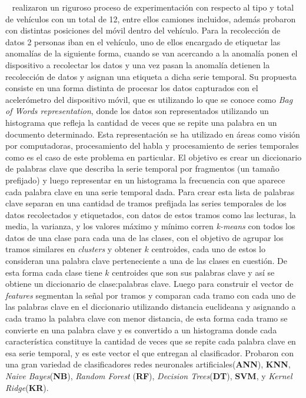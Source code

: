 		~ realizaron un riguroso proceso de experimentación con respecto al tipo y total de vehículos con
		un total de 12, entre ellos camiones incluidos, además probaron con distintas posiciones del móvil dentro del vehículo. Para la recolección de datos 2
		personas iban en el vehículo, uno de ellos encargado de etiquetar las anomalías de la siguiente forma, cuando se van acercando a la anomalía ponen el
		dispositivo a recolectar los datos y una vez pasan la anomalía detienen la recolección de datos y asignan una etiqueta a dicha serie temporal. Su
		propuesta consiste en una forma distinta de procesar los datos capturados con el acelerómetro del dispositivo móvil, que es utilizando lo que se conoce
		como \emph{Bag of Words representation}, donde los datos son representados utilizando un histograma que refleja la cantidad de veces que se repite una
		palabra en un documento determinado. Esta representación se ha utilizado en áreas como visión por computadoras, procesamiento del habla y procesamiento
		de series temporales como es el caso de este problema en particular. El objetivo es crear un diccionario de palabras clave que describa la serie temporal
		por fragmentos (un tamaño prefijado) y luego representar en un histograma la frecuencia con que aparece cada palabra clave en una serie temporal dada.
		Para crear esta lista de palabras clave separan en una cantidad de tramos prefijada las series temporales de los datos recolectados y etiquetados, con
		datos de estos tramos como las lecturas, la media, la varianza, y los valores máximo y mínimo corren \emph{k-means} con todos los datos de una clase para
		cada una de las clases, con el objetivo de agrupar los tramos similares en \emph{clusters} y obtener $k$ centroides, cada uno de estos lo consideran una
		palabra clave perteneciente a una de las clases en cuestión. De esta forma cada clase tiene $k$ centroides que son sus palabras clave y así se obtiene 
		un diccionario de clase:palabras clave. Luego para construir el vector de \emph{features} segmentan la señal por tramos y comparan cada tramo con cada
		uno de las palabras clave en el diccionario utilizando distancia euclideana y asignando a cada tramo la palabra clave con menor distancia, de esta forma
		cada tramo se convierte en una palabra clave y es convertido a un histograma donde cada característica constituye la cantidad de veces que se repite cada
		palabra clave en esa serie temporal, y es este vector el que entregan al clasificador. Probaron con una gran variedad de clasificadores redes neuronales
		artificiales(\textbf{ANN}), \textbf{KNN}, \emph{Naive Bayes}(\textbf{NB}), \emph{Random Forest} (\textbf{RF}), \emph{Decision Trees}(\textbf{DT}),
		\textbf{SVM}, y \emph{Kernel Ridge}(\textbf{KR}).\\

